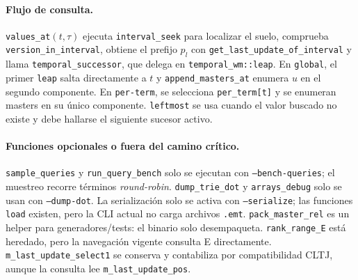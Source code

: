 \paragraph{Flujo de consulta.}
\texttt{values\_at}$(t,\tau)$ ejecuta
\texttt{interval\_seek} para localizar el suelo, comprueba
\texttt{version\_in\_interval}, obtiene el prefijo $p_l$ con
\texttt{get\_last\_update\_of\_interval} y llama
\texttt{temporal\_successor}, que delega en \texttt{temporal\_wm::leap}.
En \texttt{global}, el primer \texttt{leap} salta directamente a $t$ y
\texttt{append\_masters\_at} enumera $u$ en el segundo componente. En
\texttt{per-term}, se selecciona \texttt{per\_term[t]} y se enumeran masters
en su único componente. \texttt{leftmost} se usa cuando el valor buscado no
existe y debe hallarse el siguiente sucesor activo.

\paragraph{Funciones opcionales o fuera del camino crítico.}
\texttt{sample\_queries} y \texttt{run\_query\_bench} solo se ejecutan con
\texttt{--bench-queries}; el muestreo recorre términos \emph{round-robin}.
\texttt{dump\_trie\_dot} y \texttt{arrays\_debug} solo se usan con
\texttt{--dump-dot}. La serialización solo se activa con
\texttt{--serialize}; las funciones \texttt{load} existen, pero la CLI actual
no carga archivos \texttt{.emt}. \texttt{pack\_master\_rel} es un helper para
generadores/tests: el binario solo desempaqueta. \texttt{rank\_range\_E} está
heredado, pero la navegación vigente consulta E directamente.
\texttt{m\_last\_update\_select1} se conserva y contabiliza por compatibilidad
CLTJ, aunque la consulta lee \texttt{m\_last\_update\_pos}.

